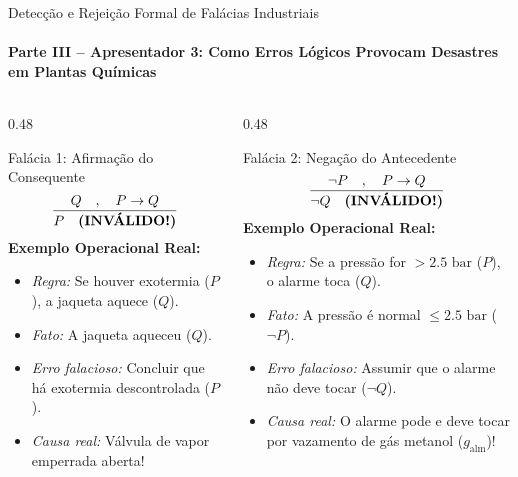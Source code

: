 \documentclass[aspectratio=169, 10pt]{beamer}
\begin{document}
\begin{frame}{Detecção e Rejeição Formal de Falácias Industriais}
  \framesubtitle{Parte III -- Apresentador 3: Como Erros Lógicos Provocam Desastres em Plantas Químicas}
  \begin{columns}[t]
    \begin{column}{0.48\textwidth}
      \begin{alertblock}{Falácia 1: Afirmação do Consequente}
        $$\frac{Q \quad,\quad P \to Q}{P \quad \text{\textbf{(INVÁLIDO!)}}}$$
        \textbf{Exemplo Operacional Real:}
        \begin{itemize}
          \item \textit{Regra:} Se houver exotermia ($P$), a jaqueta aquece ($Q$).
          \item \textit{Fato:} A jaqueta aqueceu ($Q$).
          \item \textit{Erro falacioso:} Concluir que há exotermia descontrolada ($P$).
          \item \textit{Causa real:} Válvula de vapor emperrada aberta!
        \end{itemize}
      \end{alertblock}
    \end{column}

    \begin{column}{0.48\textwidth}
      \begin{alertblock}{Falácia 2: Negação do Antecedente}
        $$\frac{\neg P \quad,\quad P \to Q}{\neg Q \quad \text{\textbf{(INVÁLIDO!)}}}$$
        \textbf{Exemplo Operacional Real:}
        \begin{itemize}
          \item \textit{Regra:} Se a pressão for $> 2.5\text{ bar}$ ($P$), o alarme toca ($Q$).
          \item \textit{Fato:} A pressão é normal $\le 2.5\text{ bar}$ ($\neg P$).
          \item \textit{Erro falacioso:} Assumir que o alarme não deve tocar ($\neg Q$).
          \item \textit{Causa real:} O alarme pode e deve tocar por vazamento de gás metanol ($g_{\text{alm}}$)!
        \end{itemize}
      \end{alertblock}
    \end{column}
  \end{columns}
\end{frame}
\end{document}
